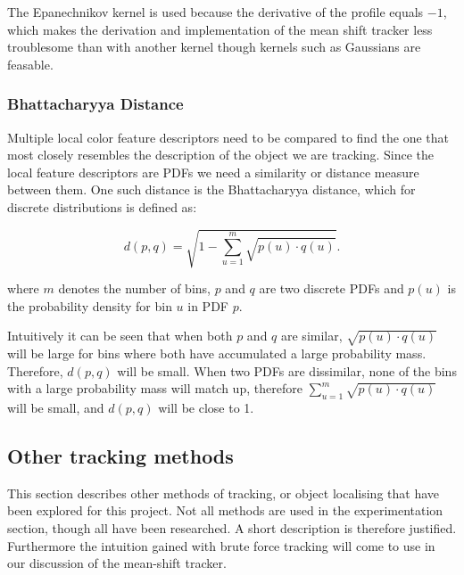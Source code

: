 \documentclass[a4paper,11pt]{article}
\begin{document}
The Epanechnikov kernel is used because the derivative of the profile equals $-1$, which makes the derivation and implementation of the mean shift tracker less troublesome than with another kernel though kernels such as Gaussians are feasable.



\subsubsection{Bhattacharyya Distance}

Multiple local color feature descriptors need to be compared to find the one that most closely resembles the description of the object we are tracking. Since the local feature descriptors are PDFs we need a similarity or distance measure between them. One such distance is the Bhattacharyya distance, which for discrete distributions is defined as:



\begin{equation}

\label{eq:bhattdistance}

d(p,q) = \sqrt{1-\sum_{u=1}^{m} \sqrt{p(u)\cdot q(u)}}.

\end{equation}

where $m$ denotes the number of bins, $p$ and $q$ are two discrete PDFs and $p(u)$ is the probability density for bin $u$ in PDF $p$. 



Intuitively it can be seen that when both $p$ and $q$ are similar, $\sqrt{p(u)\cdot q(u)}$ will be large for bins where both have accumulated a large probability mass. Therefore, $d(p,q)$ will be small. When two PDFs are dissimilar, none of the bins with a large probability mass will match up, therefore  $\sum_{u=1}^{m} \sqrt{p(u)\cdot q(u)}$ will be small, and $d(p,q)$ will be close to 1.






\subsection{Other tracking methods}

This section describes other methods of tracking, or object localising that have been explored for this project. Not all methods are used in the experimentation section, though all have been researched. A short description is therefore justified. Furthermore the intuition gained with brute force tracking will come to use in our discussion of the mean-shift tracker.
\end{document}
